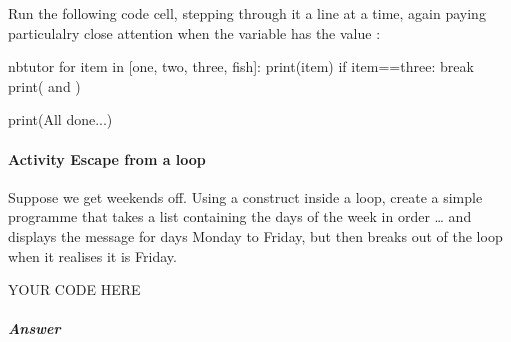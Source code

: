 \documentclass[letterpaper,10pt,english]{sphinxmanual}
\begin{document}
Run the following code cell, stepping through it a line at a time, again paying particulalry close attention when the  variable has the value :

{
\begin{sphinxVerbatim}[commandchars=\\\{\}]
\llap{\color{nbsphinxin}[ ]:\,\hspace{\fboxrule}\hspace{\fboxsep}}\PYGZpc{}\PYGZpc{}nbtutor
for item in [\PYGZsq{}one\PYGZsq{}, \PYGZsq{}two\PYGZsq{}, \PYGZsq{}three\PYGZsq{}, \PYGZsq{}fish\PYGZsq{}]:
    print(item)
    if item==\PYGZsq{}three\PYGZsq{}:
        break
    print(\PYGZsq{} and \PYGZsq{})

print(\PYGZsq{}All done...\PYGZsq{})
\end{sphinxVerbatim}
}


\paragraph{Activity \sphinxhyphen{} Escape from a  loop}
\label{\detokenize{content/02_Robot_Lab/Section_00_01:Activity---Escape-from-a-for...in...-loop}}
Suppose we get weekends off. Using a  construct inside a  loop, create a simple programme that takes a list containing the days of the week in order … and displays the message  for days Monday to Friday, but then breaks out of the loop when it realises it is Friday.

{
\begin{sphinxVerbatim}[commandchars=\\\{\}]
\llap{\color{nbsphinxin}[ ]:\,\hspace{\fboxrule}\hspace{\fboxsep}}\PYGZsh{} YOUR CODE HERE
\end{sphinxVerbatim}
}


\subparagraph{Answer}
\label{\detokenize{content/02_Robot_Lab/Section_00_01:id3}}
\end{document}
